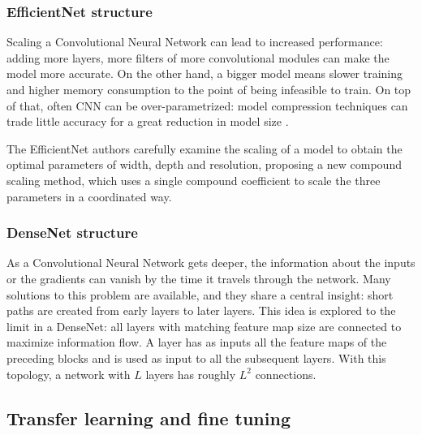 \subsubsection{EfficientNet structure}

Scaling a Convolutional Neural Network can lead to increased performance:
adding more layers, more filters of more convolutional modules can make the
model more accurate. On the other hand, a bigger model means slower training
and higher memory consumption to the point of being infeasible to train.
On top of that, often CNN can be over-parametrized: model compression
techniques can trade little accuracy for a great reduction in model size
\cite{han2016deep}.

The EfficientNet authors carefully examine the scaling of a model to obtain the
optimal parameters of width, depth and resolution, proposing a new compound
scaling method, which uses a single compound coefficient to scale the three
parameters in a coordinated way.

\subsubsection{DenseNet structure}

As a Convolutional Neural Network gets deeper, the information about the inputs
or the gradients can vanish by the time it travels through the network.
Many solutions to this problem are available, and they share a central insight:
short paths are created from early layers to later layers.
This idea is explored to the limit in a DenseNet: all layers with matching feature
map size are connected to maximize information flow.
A layer has as inputs all the feature maps of the preceding blocks and is used
as input to all the subsequent layers.
With this topology, a network with $L$ layers has roughly $L^2$ connections.

\subsection{Transfer learning and fine tuning}


